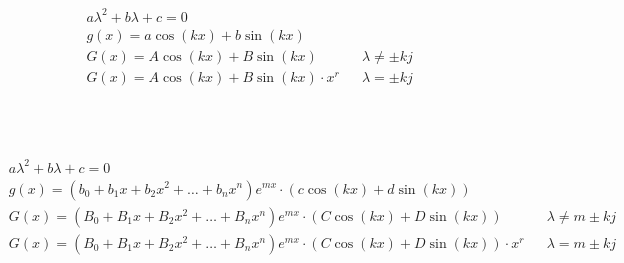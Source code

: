 \begin{boxleft}
\\
\\
\end{boxleft}\begin{boxrightshaded}
\begin{align*}
&a\lambda^2+b\lambda+c=0\\
&g(x)=a\cos\left(kx\right)+b\sin\left(kx\right)\\
&G(x)=A\cos\left(kx\right)+B\sin\left(kx\right)&&\text{$\lambda\neq \pm kj$}\\
&G(x)=A\cos\left(kx\right)+B\sin\left(kx\right)\cdot x^r&&\text{$\lambda = \pm kj$}
\end{align*}
\end{boxrightshaded}



\begin{boxleft}
\\
\\
\end{boxleft}\begin{boxrightshaded}
\begin{align*}
&a\lambda^2+b\lambda+c=0\\
&g(x)=\left(b_0+b_1x+b_2x^2+\dots+b_nx^n\right)e^{mx}\cdot\left(c\cos\left(kx\right)+d\sin\left(kx\right)\right)\\
&G(x)=\left(B_0+B_1x+B_2x^2+\dots+B_nx^n\right)e^{mx}\cdot\left(C\cos\left(kx\right)+D\sin\left(kx\right)\right)&&\text{$\lambda\neq m \pm kj$}\\
&G(x)=\left(B_0+B_1x+B_2x^2+\dots+B_nx^n\right)e^{mx}\cdot\left(C\cos\left(kx\right)+D\sin\left(kx\right)\right)\cdot x^r&&\text{$\lambda= m \pm kj$}
\end{align*}
\end{boxrightshaded}